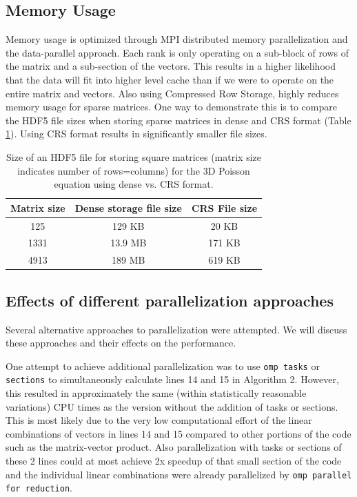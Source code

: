 \documentclass{article}
\begin{document}
\subsection{Memory Usage}
Memory usage is optimized through MPI distributed memory parallelization and the data-parallel approach. Each rank is only operating on a sub-block of rows of the matrix and a sub-section of the vectors. This results in a higher likelihood that the data will fit into higher level cache than if we were to operate on the entire matrix and vectors. Also using Compressed Row Storage, highly reduces memory usage for sparse matrices. One way to demonstrate this is to compare the HDF5 file sizes when storing sparse matrices in dense and CRS format (Table \ref{table:file_sizes}). Using CRS format results in significantly smaller file sizes.


\begin{table}[H]
	\centering
	\begin{tabular}{|c|c|c|}
		\hline
		Matrix size & Dense storage file size  & CRS File size  \\
		\hline
		125           &  129 KB  & 20 KB   \\
		1331          &  13.9 MB  &  171 KB   \\
		4913       &  189 MB  & 619 KB  \\
		\hline
		
	\end{tabular}
	\caption{Size of an HDF5 file for storing square matrices (matrix size indicates number of rows=columns) for the 3D Poisson equation using dense vs. CRS format.}
	\label{table:file_sizes}
\end{table} 

\subsection{Effects of different parallelization approaches}
Several alternative approaches to parallelization were attempted. We will discuss these approaches and their effects on the performance. 

One attempt to achieve additional parallelization was to use \texttt{omp tasks} or \texttt{sections} to simultaneously calculate lines 14 and 15 in Algorithm 2. However, this resulted in approximately the same (within statistically reasonable variations) CPU times as the version without the addition of tasks or sections. This is most likely due to the very low computational effort of the linear combinations of vectors in lines 14 and 15 compared to other portions of the code such as the matrix-vector product. Also parallelization with tasks or sections of these 2 lines could at most achieve 2x speedup of that small section of the code and the individual linear combinations were already parallelized by \texttt{omp parallel for reduction}.
\end{document}
